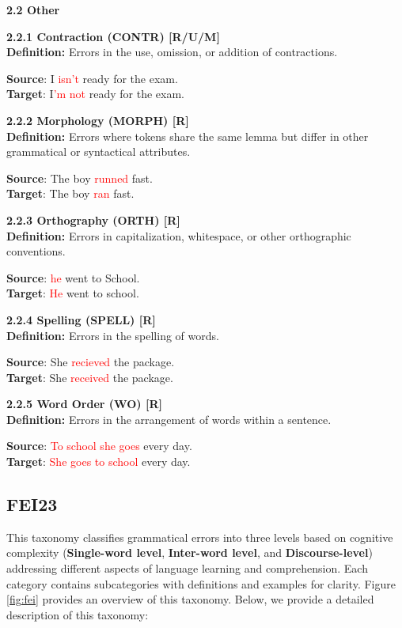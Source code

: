 \begin{tcolorbox}[breakable]
\noindent \textbf{2.2 Other}

\noindent \textbf{2.2.1 Contraction (CONTR) [R/U/M]}\\
\textbf{Definition:} Errors in the use, omission, or addition of contractions.


\textbf{Source}: I \textcolor{red}{isn't} ready for the exam. \\
\textbf{Target}: I\textcolor{red}{'m not} ready for the exam.


\noindent \textbf{2.2.2 Morphology (MORPH) [R]}\\
\textbf{Definition:} Errors where tokens share the same lemma but differ in other grammatical or syntactical attributes.


\textbf{Source}: The boy \textcolor{red}{runned} fast. \\
\textbf{Target}: The boy \textcolor{red}{ran} fast.


\noindent \textbf{2.2.3 Orthography (ORTH) [R]}\\
\textbf{Definition:} Errors in capitalization, whitespace, or other orthographic conventions.


\textbf{Source}: \textcolor{red}{he} went to School. \\
\textbf{Target}: \textcolor{red}{He} went to school.


\noindent \textbf{2.2.4 Spelling (SPELL) [R]}\\
\textbf{Definition:} Errors in the spelling of words.


\textbf{Source}: She \textcolor{red}{recieved} the package. \\
\textbf{Target}: She \textcolor{red}{received} the package.


\noindent \textbf{2.2.5 Word Order (WO) [R]}\\
\textbf{Definition:} Errors in the arrangement of words within a sentence.


\textbf{Source}: \textcolor{red}{To school she goes} every day. \\
\textbf{Target}: \textcolor{red}{She goes to school} every day.

\end{tcolorbox}

\subsection{FEI23}
\label{subsec: enhancing}
This taxonomy classifies grammatical errors into three levels based on cognitive complexity (\textbf{Single-word level}, \textbf{Inter-word level}, and \textbf{Discourse-level}) addressing different aspects of language learning and comprehension. Each category contains subcategories with definitions and examples for clarity. Figure \ref{fig:fei} provides an overview of this taxonomy. Below, we provide a detailed description of this taxonomy:

